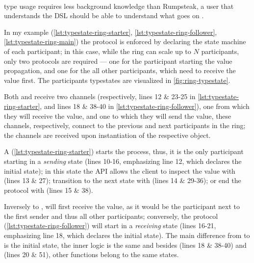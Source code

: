 \paragraph{} type usage requires less background knowledge than Rumpsteak,
a user that understands the \gls{DSL} should be able to understand what goes on .

In my example (\autoref{lst:typestate-ring-starter}, \autoref{lst:typestate-ring-follower},  \autoref{lst:typestate-ring-main})
the protocol is enforced by declaring the state machine of each participant;
in this case, while the ring can scale up to $N$ participants, only two protocols are required ---
one for the participant starting the value propagation,
and one for the all other participants, which need to receive the value first.
The participants typestates are visualized in \autoref{fig:ring-typestate}.

Both \textcolor{structblue}{} and \textcolor{structblue}{} receive two channels
(respectively, lines 12 \& 23-25 in \autoref{lst:typestate-ring-starter}, and lines 18 \& 38-40 in \autoref{lst:typestate-ring-follower}),
one from which they will receive the value, and one to which they will send the value,
these channels, respectively, connect to the previous and next participants in the ring;
the channels are received upon instantiation of the respective \textcolor{structblue}{} object.

\textcolor{structblue}{A} (\autoref{lst:typestate-ring-starter}) starts the process,
thus, it is the only participant starting in a \emph{sending} state
(lines 10-16, emphasizing line 12, which declares the initial state);
in this state the \gls{API} allows the client to inspect the value with  (lines 13 \& 27);
transition to the next state with  (lines 14 \& 29-36);
or end the protocol with  (lines 15 \& 38).

Inversely to \textcolor{structblue}{}, \textcolor{structblue}{} will first receive the value,
as it would be the participant next to the first sender and thus all other participants;
conversely, the protocol (\autoref{lst:typestate-ring-follower}) will start in a \emph{receiving} state
(lines 16-21, emphasizing line 18, which declares the initial state).
The main difference from \textcolor{structblue}{} to \textcolor{structblue}{} is the initial state, the inner logic is the same
and besides  (lines 18 \& 38-40) and  (lines 20 \& 51), other functions belong to the same states.

